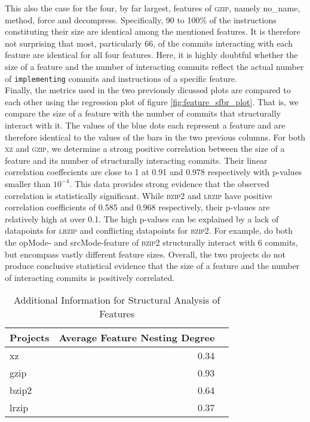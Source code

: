 This also the case for the four, by far largest, features of \textsc{gzip}, namely \textsf{no\_name, method, force} and \textsf{decompress}.
Specifically, 90 to 100\% of the instructions constituting their size are identical among the mentioned features.
It is therefore not surprising that most, particularly 66, of the commits interacting with each feature are identical for all four features.
Here, it is highly doubtful whether the size of a feature and the number of interacting commits reflect the actual number of \texttt{implementing} commits and instructions of a specific feature. \\
Finally, the metrics used in the two previously dicussed plots are compared to each other using the regression plot of figure \ref{fig:feature_sfbr_plot}.
That is, we compare the size of a feature with the number of commits that structurally interact with it.
The values of the blue dots each represent a feature and are therefore identical to the values of the bars in the two previous columns.
For both \textsc{xz} and \textsc{gzip}, we determine a strong positive correlation between the size of a feature and its number of structurally interacting commits.
Their linear correlation coeffecients are close to 1 at 0.91 and 0.978 respectively with p-values smaller than $10^{-4}$.
This data provides strong evidence that the observed correlation is statistically significant.
While \textsc{bzip2} and \textsc{lrzip} have positive correlation coefficients of 0.585 and 0.968 respectively, their p-vlaues are relatively high at over 0.1.
The high p-values can be explained by a lack of datapoints for \textsc{lrzip} and conflicting datapoints for \textsc{bzip2}.
For example, do both the \textsf{opMode}- and \textsf{srcMode}-feature of \textsc{bzip2} structurally interact with 6 commits, but encompass vastly different feature sizes.
Overall, the two projects do not produce conclusive statistical evidence that the size of a feature and the number of interacting commits is positively correlated.

\begin{table}[t]
\caption{Additional Information for Structural Analysis of Features}
\label{tab:feature_sfbr_table}
\centering
\begin{tabular}{l rS}
\toprule
\textbf{Projects} & \textbf{Average Feature Nesting Degree} \\ 
\midrule
  xz    & 0.34 \\
  gzip  & 0.93 \\
  bzip2 & 0.64 \\
  lrzip & 0.37 \\
\bottomrule
\end{tabular}
\end{table}

